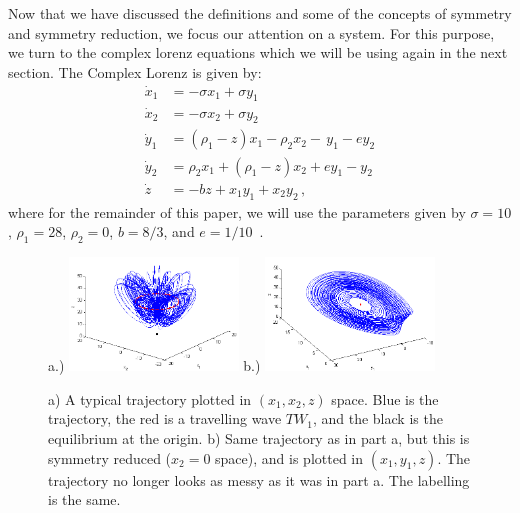 \documentclass[10pt,letter]{article}
\begin{document}
Now that we have discussed the definitions and some of the concepts of
symmetry and symmetry reduction, we focus our attention on a system.  For
this purpose, we turn to the complex lorenz equations which we will be
using again in the next section. The Complex Lorenz is given by:
\begin{equation}
\begin{split}
  \dot x_1 &= -\sigma x_1  + \sigma y_1 \\
  \dot x_2 &=  -\sigma x_2  + \sigma y_2 \\
  \dot y_1 &= (\rho_1  -  z)x_1  -  \rho_2x_2  - \, y_1  - ey_2 \\
  \dot y_2 &= \rho_2x_1  +  (\rho_1  -  z)x_2  +  ey_1  -  y_2 \\
  \dot z &= -bz  + x_1y_1+x_2y_2 \,,
  \label{eq:CLE}
\end{split}
\end{equation}
where for the remainder of this paper, we will use the parameters given
by $\sigma = 10$, $\rho_1 = 28$, $\rho_2 = 0$, $b = 8/3$, and $e =
1/10$~\cite{Eth}.
\begin{figure}[h]
\centering
a.)  \includegraphics[width=0.40\textwidth]{Figs/Section2/kcCLEaxisonc.png}
b.)
  \includegraphics[width=0.40\textwidth]{Figs/Section2/kcCLEredaxisonc.png}
\caption{
a) A typical trajectory plotted in $(x_1, x_2, z)$ space.  Blue is the
trajectory, the red is a travelling wave $TW_1$, and the black is the
equilibrium at the origin.
b) Same trajectory as in part a, but this is symmetry reduced ($x_2 = 0$
space), and is plotted in $(x_1, y_1, z)$.  The trajectory no longer
looks as messy as it was in part a.  The labelling is the same.
}
 \label{fig:CLETraj}
\end{figure}
\end{document}
